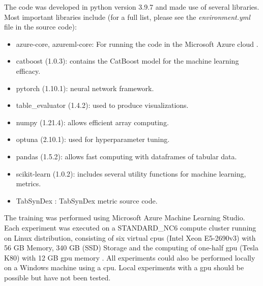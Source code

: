 The code was developed in python version 3.9.7 and made use of several libraries.
Most important libraries include (for a full list, please see the \textit{environment.yml} file in the source code):
\begin{itemize}
	\item azure-core, azureml-core: For running the code in the Microsoft Azure cloud \cite{microsoft2023CloudComputingServices}.
	\item catboost (1.0.3): contains the CatBoost model for the machine learning efficacy.
	\item pytorch (1.10.1): neural network framework.
	\item table\_evaluator (1.4.2): used to produce visualizations.
	\item numpy (1.21.4): allows efficient array computing.
	\item optuna (2.10.1): used for hyperparameter tuning.
	\item pandas (1.5.2): allows fast computing with dataframes of tabular data.
	\item scikit-learn (1.0.2): includes several utility functions for machine learning, \eg metrics.
	\item TabSynDex \cite{chundawat2022UniversalMetricRobusta}: TabSynDex metric source code.
\end{itemize}

The training was performed using Microsoft Azure Machine Learning Studio.
Each experiment was executed on a STANDARD\_NC6 compute cluster running on Linux distribution, consisting of six virtual \glspl{cpu} (Intel Xeon E5-2690v3) with 56 GB Memory, 340 GB (SSD) Storage and the computing of one-half \gls{gpu} (Tesla K80) with 12 GB \gls{gpu} memory \cite{vikancha-msft2022NCseriesAzureVirtual}.
All experiments could also be performed locally on a Windows machine using a \gls{cpu}.
Local experiments with a \gls{gpu} should be possible but have not been tested.

